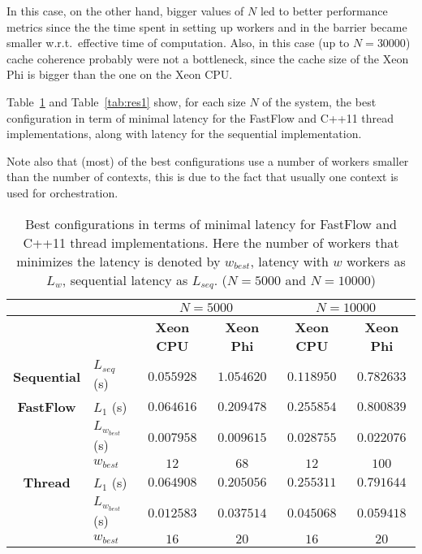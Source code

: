 In this case, on the other hand, bigger values of $N$ led to better performance metrics since the the time spent in setting up workers and in the barrier became smaller w.r.t.\ effective time of computation.
Also, in this case (up to $N = 30000$) cache coherence probably were not a bottleneck, since the cache size of the Xeon Phi is bigger than the one on the Xeon CPU.

Table~\ref{tab:res0} and Table~\ref{tab:res1} show, for each size $N$ of the system, the best configuration in term of minimal latency for the FastFlow and C++11 thread implementations, along with latency for the sequential implementation.

Note also that (most) of the best configurations use a number of workers smaller than the number of contexts, this is due to the fact that usually one context is used for orchestration.
\begin{table}[h]
	\centering
	\begin{tabular}{clcccc}  
		\toprule
		& & \multicolumn{2}{c}{\textbf{$N = 5000$}} & \multicolumn{2}{c}{\textbf{$N = 10000$}}\\
		\midrule
		& & \textbf{Xeon CPU} & \textbf{Xeon Phi} & \textbf{Xeon CPU} & \textbf{Xeon Phi}\\
		\cmidrule{3-6}		
		\textbf{Sequential} & $L_{seq}$ (\si{s}) & $0.055928$& $1.054620$ & $0.118950$& $0.782633$\\
		\midrule
		\textbf{FastFlow} & $L_1$ (\si{s}) & $0.064616$ & $0.209478$ & $0.255854$ & $0.800839$\\
		& $L_{w_{best}}$ (\si{s}) & $0.007958$ & $0.009615$ & $0.028755$ & $0.022076$\\
		& $w_{best}$ & $12$ & $68$ & $12$ & $100$\\
		\midrule
		\textbf{Thread} & $L_1$ (\si{s})& $0.064908$ & $0.205056$ & $0.255311$ & $0.791644$\\
		& $L_{w_{best}}$ (\si{s})& $0.012583$ & $0.037514$ & $0.045068$ & $0.059418$\\
		& $w_{best}$ & $16$ & $20$ & $16$ & $20$ \\
		\bottomrule
	\end{tabular}
	\caption{Best configurations in terms of minimal latency for FastFlow and C++11 thread implementations. 
		Here the number of workers that minimizes the latency is denoted by $w_{best}$, latency with $w$ workers as $L_w$, sequential latency as $L_{seq}$. ($N = 5000$ and $N=10000$)}
	\label{tab:res0}
\end{table}
~
